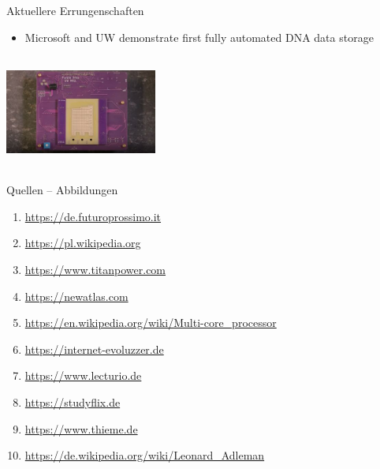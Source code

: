 \documentclass{beamer}
\begin{document}
\begin{frame}{Aktuellere Errungenschaften}
	\begin{itemize}
		\item Microsoft and UW demonstrate first fully automated DNA data storage
	\end{itemize}

	\begin{columns}
		\centering
		\includegraphics[height=3cm, width=5cm]{./13.jpg}%
\end{columns}
\end{frame}
\begin{frame}{Quellen – Abbildungen}

\begin{enumerate}
\item \href{https://de.futuroprossimo.it/2020/01/un-computer-di-dna-puo-calcolare-la-radice-quadrata-di-numeri-fino-a-900/}{https://de.futuroprossimo.it}
\item 
\href{https://pl.wikipedia.org/wiki/No\%C5\%9Bnik_danych}{https://pl.wikipedia.org}
\item
\href{https://www.titanpower.com/blog/increasing-rate-of-data-production-prompts-google-to-rethink-data-center-storage/}{https://www.titanpower.com}
\item
\href{https://newatlas.com/smallest-transistors-microfabrication/57583/}{https://newatlas.com}
\item
\href{https://en.wikipedia.org/wiki/Multi-core_processor}{https://en.wikipedia.org/wiki/Multi-core\_processor}
\item
\href{ https://internet-evoluzzer.de/mars-versus-venus-teil-5-schimpansen-mann-und-menschen-frau/}{https://internet-evoluzzer.de}
\item
\href{ https://www.lecturio.de/magazin/dna/}{https://www.lecturio.de}
\item
\href{https://studyflix.de/biologie/dna-desoxyribonukleinsaure-2444}{https://studyflix.de}
\item
\href{https://www.thieme.de/de/psychiatrie-psychotherapie-psychosomatik/sozialpsychiatrie-kann-abgeschafft-werden-pro-kontra-53872.htm}{https://www.thieme.de}
\item
\href{https://de.wikipedia.org/wiki/Leonard_Adleman}{https://de.wikipedia.org/wiki/Leonard\_Adleman}
\end{enumerate}
\end{frame}
\end{document}
